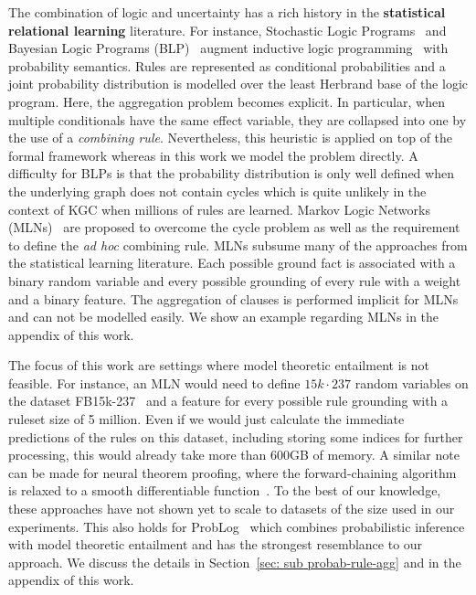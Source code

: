 \documentclass{article}
\theoremstyle{plain}
\theoremstyle{remark}
\begin{document}
The combination of logic and uncertainty has a rich history in the \textbf{statistical relational learning} literature. For instance, Stochastic Logic Programs~\cite{muggleton1996stochastic,sato1997prism} and Bayesian Logic Programs (BLP)~\cite{kersting2001towards} augment inductive logic programming~\cite{muggleton1994inductive} with probability semantics. Rules are represented as conditional probabilities and a joint probability distribution is modelled over the least Herbrand base of the logic program. Here, the aggregation problem becomes explicit. In particular, when multiple conditionals have the same effect variable, they are collapsed into one by the use of a \textit{combining rule}. Nevertheless, this heuristic is applied on top of the formal framework whereas in this work we model the problem directly. A difficulty for BLPs is that the probability distribution is only well defined when the underlying graph does not contain cycles which is quite unlikely in the context of KGC when millions of rules are learned. Markov Logic Networks (MLNs)~\cite{richardson2006markov} are proposed to overcome the cycle problem as well as the requirement to define the \textit{ad hoc} combining rule. MLNs subsume many of the approaches from the statistical learning literature. Each possible ground fact is associated with a binary random variable and every possible grounding of every rule with a weight and a binary feature.
The aggregation of clauses is performed implicit for MLNs and can not be modelled easily. We show an example regarding MLNs in the appendix of this work.

The focus of this work are settings where model theoretic entailment is not feasible. For instance, an MLN would need to define $15k \cdot 237$ random variables on the dataset FB15k-237~\cite{toutanova2015observed} and a feature for every possible rule grounding with a ruleset size of 5 million. Even if we  would just calculate the immediate predictions of the rules on this dataset, including storing some indices for further processing, this would already take more than 600GB of memory. A similar note can be made for neural theorem proofing, where the forward-chaining algorithm is relaxed to a smooth differentiable function~\cite{evans2018learning,rocktaschel2017endNTP1,minervini2020differentiableGNTP,minervini2020learningCNTP}. To the best of our knowledge, these approaches have not shown yet to scale to datasets of the size used in our experiments. This also holds for ProbLog~\cite{de2007problog} which combines probabilistic inference with model theoretic entailment and has the strongest resemblance to our approach. We discuss the details in Section~\ref{sec: sub probab-rule-agg} and in the appendix of this work.
\end{document}
